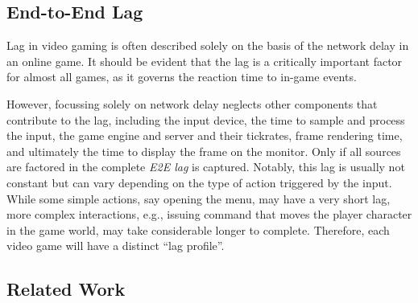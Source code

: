 \subsection{End-to-End Lag}
\label{sec:e2e-lag}

Lag in video gaming is often described solely on the basis of the network delay in an online game. It should be evident that the lag is a critically important factor for almost all games, as it governs the reaction time to in-game events.

However, focussing solely on network delay neglects other components that contribute to the lag, including the input device, the time to sample and process the input, the game engine and server and their tickrates, frame rendering time, and ultimately the time to display the frame on the monitor. Only if all sources are factored in the complete \textit{\gls{E2E} lag} is captured. Notably, this lag is usually not constant but can vary depending on the type of action triggered by the input. While some simple actions, say opening the menu, may have a very short lag, more complex interactions, e.g., issuing command that moves the player character in the game world, may take considerable longer to complete. %
Therefore, each video game will have a distinct ``lag profile''.





\subsection{Related Work}
\label{sec:relatedwork}

